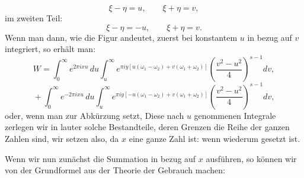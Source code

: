 \[ \xi - \eta = u, \qquad \xi + \eta = v, \]
im zweiten Teil:
\[ \xi - \eta = -u, \qquad \xi + \eta = v. \]
Wenn man dann, wie die Figur andeutet, zuerst bei konstantem
 $u$ in bezug auf $v$ integriert, so erhält man:
\[
W = \int_0^\infty e^{2\pi ixu}\,du\int_u^\infty e^{\pi iy[u(\omega_1-\omega_2)+v(\omega_1+\omega_2)]}\left(\frac{v^2-u^2}{4}\right)^{s-1}dv,
\]
\[
{}+\int_0^\infty e^{-2\pi ixu}\,du\int_u^\infty e^{\pi iy[-u(\omega_1-\omega_2)+v(\omega_1+\omega_2)]}\left(\frac{v^2-u^2}{4}\right)^{s-1}dv,
\]
oder, wenn man zur Abkürzung
setzt,
Diese nach $u$ genommenen Integrale zerlegen wir in lauter
solche Bestandteile, deren Grenzen die Reihe der ganzen Zahlen
sind, wir setzen also, da $x$ eine ganze Zahl ist:
wenn wiederum
gesetzt ist.

Wenn wir nun zunächst die Summation in bezug auf $x$ ausführen, so können wir von der Grundformel aus der Theorie der
 Gebrauch machen:
